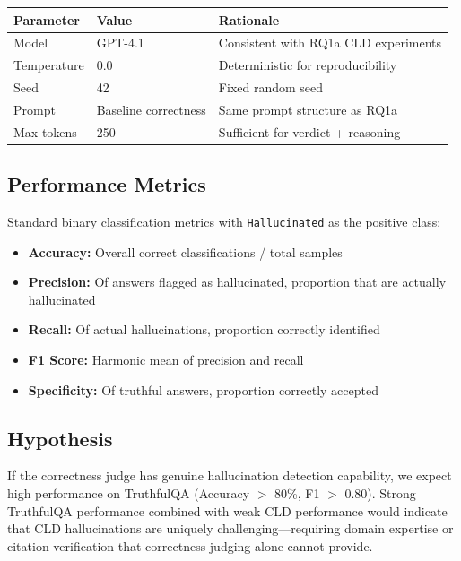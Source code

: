 \begin{table}[H]
\centering
\footnotesize
\begin{tabular}{@{}l l l@{}}
\toprule
\textbf{Parameter} & \textbf{Value} & \textbf{Rationale} \\
\midrule
Model & GPT-4.1 & Consistent with RQ1a CLD experiments \\
Temperature & 0.0 & Deterministic for reproducibility \\
Seed & 42 & Fixed random seed \\
Prompt & Baseline correctness & Same prompt structure as RQ1a \\
Max tokens & 250 & Sufficient for verdict + reasoning \\
\bottomrule
\end{tabular}
\end{table}

\subsection{Performance Metrics}

Standard binary classification metrics with \texttt{Hallucinated} as the positive class:
\begin{itemize}[noitemsep]
    \item \textbf{Accuracy:} Overall correct classifications / total samples
    \item \textbf{Precision:} Of answers flagged as hallucinated, proportion that are actually hallucinated
    \item \textbf{Recall:} Of actual hallucinations, proportion correctly identified
    \item \textbf{F1 Score:} Harmonic mean of precision and recall
    \item \textbf{Specificity:} Of truthful answers, proportion correctly accepted
\end{itemize}

\subsection{Hypothesis}

If the correctness judge has genuine hallucination detection capability, we expect high performance on TruthfulQA (Accuracy $>$ 80\%, F1 $>$ 0.80). Strong TruthfulQA performance combined with weak CLD performance would indicate that CLD hallucinations are uniquely challenging---requiring domain expertise or citation verification that correctness judging alone cannot provide.

